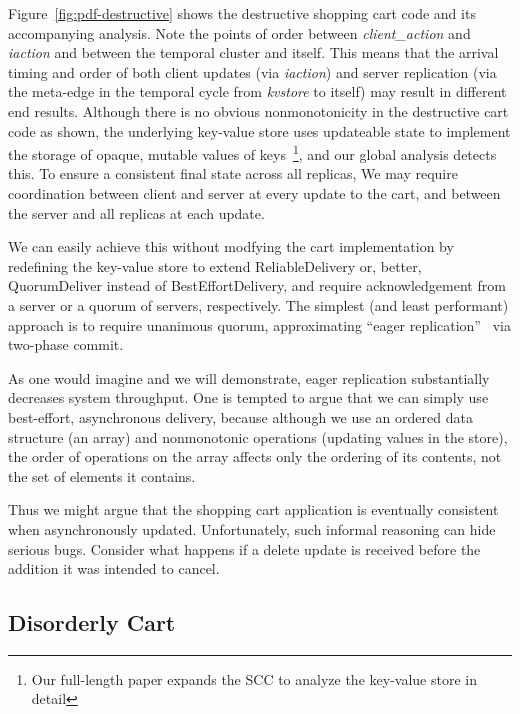 Figure~\ref{fig:pdf-destructive} shows the destructive shopping cart code
and its accompanying analysis.  Note the points of order between \emph{client\_action} and \emph{iaction}
and between the temporal cluster and itself.  This means that the arrival 
timing and order of both client updates (via \emph{iaction}) and
server replication (via the meta-edge in the temporal cycle from 
\emph{kvstore} to itself) may result in different
end results.  Although there is no obvious nonmonotonicity in the destructive
cart code as shown, the underlying key-value store uses updateable state
to implement the storage of opaque, mutable values of 
keys~\footnote{Our full-length paper expands the SCC to analyze the
key-value store in detail}, 
and our global analysis detects this.
To ensure a consistent final state across all replicas, We may require coordination
between client and server at every update to the cart, and between the 
server and all replicas at each update.  

We can easily achieve this without modfying the cart implementation
by redefining the key-value store to extend
ReliableDelivery or, better, QuorumDeliver instead of BestEffortDelivery, and require acknowledgement from a server or a quorum of servers, respectively.
The simplest (and least performant) approach is to require unanimous quorum,
approximating ``eager replication''~\cite{dangers} via two-phase commit.

As one would imagine and we will demonstrate, 
eager replication substantially decreases system throughput.  One is tempted
to argue that we can simply use best-effort, asynchronous delivery,
because although we use an ordered data structure (an array) and nonmonotonic
operations (updating values in the store), the order of operations on the array
affects only the ordering of its contents, not the set of elements it contains.

Thus we might argue that the shopping cart application is eventually consistent
when asynchronously updated.  Unfortunately, such informal reasoning can
hide serious bugs.  Consider what happens if a delete update is received
before the addition it was intended to cancel.


\subsection{Disorderly Cart}


